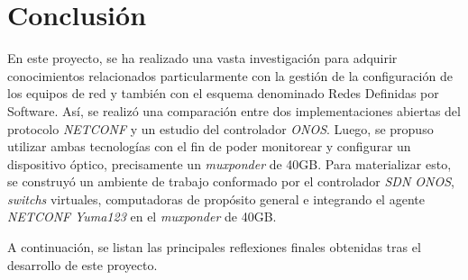 
\chapter{Conclusión} %

\label{Chapter6} %
En este proyecto, se ha realizado una vasta investigación para adquirir conocimientos relacionados particularmente con la gestión de la configuración de los equipos de red y también con el esquema denominado Redes Definidas por Software. Así, se realizó una comparación entre dos implementaciones abiertas del protocolo \textit{NETCONF} y un estudio del controlador \textit{ONOS}. Luego, se propuso utilizar ambas tecnologías con el fin de poder monitorear y configurar un dispositivo óptico, precisamente un \textit{muxponder} de 40GB. Para materializar esto, se construyó un ambiente de trabajo conformado por el controlador \textit{SDN ONOS}, \textit{switchs} virtuales, computadoras de propósito general e integrando el agente \textit{NETCONF} \textit{Yuma123} en el \textit{muxponder} de 40GB.

A continuación, se listan las principales reflexiones finales obtenidas tras el desarrollo de este proyecto.

